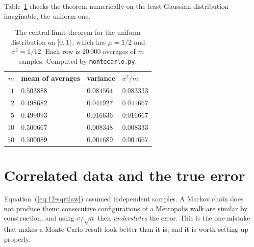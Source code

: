 Table~\ref{tab:12-clt} checks the theorem numerically on the least Gaussian
distribution imaginable, the uniform one.

\begin{table}[h]
\centering
\renewcommand{\arraystretch}{1.25}
\setlength{\tabcolsep}{12pt}
\begin{tabular}{rlll}
\toprule
$m$ & mean of averages & variance & $\sigma^2/m$\\
\midrule
$1$  & $0.503888$ & $0.084564$ & $0.083333$\\
$2$  & $0.498682$ & $0.041927$ & $0.041667$\\
$5$  & $0.499093$ & $0.016636$ & $0.016667$\\
$10$ & $0.500667$ & $0.008348$ & $0.008333$\\
$50$ & $0.500089$ & $0.001689$ & $0.001667$\\
\bottomrule
\end{tabular}
\caption{The central limit theorem for the uniform distribution on $[0,1)$,
which has $\mu=1/2$ and $\sigma^2=1/12$.  Each row is $20\,000$ averages of
$m$ samples.  Computed by \texttt{montecarlo.py}.}
\label{tab:12-clt}
\end{table}

\section{Correlated data and the true error}
\label{sec:correlations}

Equation~(\ref{eq:12-sqrtlaw}) assumed independent samples.  A Markov chain
does not produce them: consecutive configurations of a Metropolis walk are
similar by construction, and using $\sigma/\sqrt{n}$ then \emph{understates}
the error.  This is the one mistake that makes a Monte Carlo result look
better than it is, and it is worth setting up properly.

